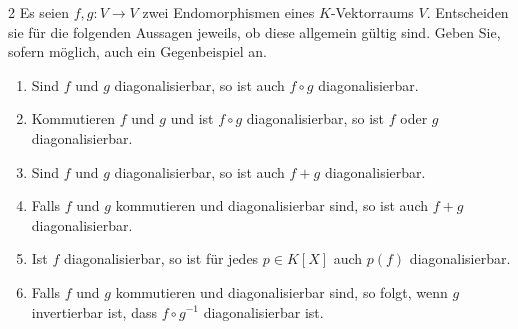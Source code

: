 \begin{question}[subtitle = Multiple Choice zur Kombination diagonalisierbarer Endomorphismen]{2}
  Es seien $f, g \colon V \to V$ zwei Endomorphismen eines $K$-Vektorraums $V$.
  Entscheiden sie für die folgenden Aussagen jeweils, ob diese allgemein gültig sind.
  Geben Sie, sofern möglich, auch ein Gegenbeispiel an.
  \begin{enumerate}[leftmargin=*]
    \item
      Sind $f$ und $g$ diagonalisierbar, so ist auch $f \circ g$ diagonalisierbar.
    \item
      Kommutieren $f$ und $g$ und ist $f \circ g$ diagonalisierbar, so ist $f$ oder $g$ diagonalisierbar.
    \item
      Sind $f$ und $g$ diagonalisierbar, so ist auch $f + g$ diagonalisierbar.
    \item
      Falls $f$ und $g$ kommutieren und diagonalisierbar sind, so ist auch $f + g$ diagonalisierbar.
    \item
      Ist $f$ diagonalisierbar, so ist für jedes $p \in K[X]$ auch $p(f)$ diagonalisierbar.
    \item
      Falls $f$ und $g$ kommutieren und diagonalisierbar sind, so folgt, wenn $g$ invertierbar ist, dass $f \circ g^{-1}$ diagonalisierbar ist.
  \end{enumerate}
\end{question}

